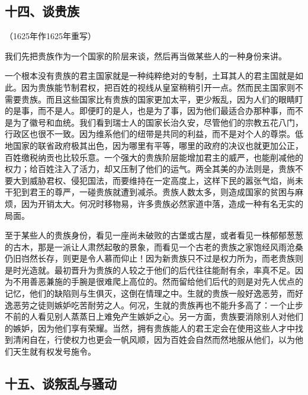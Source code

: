 \subsection*{十四、谈贵族}
\begin{center}
    （1625年作1625年重写）
\end{center}
\par 我们先把贵族作为一个国家的阶层来谈，然后再当做某些人的一种身份来讲。
\par 一个根本没有贵族的君主国家就是一种纯粹绝对的专制，土耳其人的君主国就是如此。因为贵族能节制君权，把百姓的视线从皇室稍稍引开一点。然而民主国家则不需要贵族。而且这些国家比有贵族的国家更加太平，更少叛乱，因为人们的眼睛盯的是事，而不是人。即便盯的是人，也是为了事，因为他们最适合办那种事，而不是为了徽号和血统。我们看到瑞士人的国家长治久安，尽管他们的宗教五花八门，行政区也很不一致。因为维系他们的纽带是共同的利益，而不是对个人的尊崇。低地国家的联省政府极其出色，因为哪里有平等，哪里的政府的决议也就更加公正，百姓缴税纳贡也比较乐意。一个强大的贵族阶层能增加君主的威严，也能削减他的权力；给百姓注入了活力，却又压制了他们的运气。两全其美的办法则是，贵族不要大到威胁君权、侵犯国法，而要维持在一定高度上，这样下民的嚣张气焰，尚未干犯到君王的尊严，一碰贵族就遭到减杀。贵族人数太多，则造成国家的贫困与麻烦，因为开销太大。何况时移物易，许多贵族必然家道中落，造成一种有名无实的局面。
\par 至于某些人的贵族身份，看见一座尚未破败的古堡或古屋，或者看见一株郁郁葱葱的古木，那是一派让人肃然起敬的景象，而看见一个古老的贵族之家饱经风雨沧桑仍旧岿然长存，则更是令人慕而仰止！因为新贵族只不过是权力所为，而老贵族则是时光造就。最初晋升为贵族的人较之于他们的后代往往能耐有余，率真不足。因为不用善恶兼施的手腕是很难爬上高位的。然而留给他们后代的则是对先人优点的记忆，他们的缺陷则与生俱灭，这倒在情理之中。生就的贵族一般好逸恶劳，而好逸恶劳之徒则嫉妒吃苦耐劳之人。何况，生就的贵族再也不能升多高了：一个止步不前的人看见别人蒸蒸日上难免产生嫉妒之心。另一方面，贵族要消除别人对他们的嫉妒，因为他们享有荣耀。当然，拥有贵族能人的君王定会在使用这些人才中找到清闲自在，行使权力也更会一帆风顺，因为百姓会自然而然地服从他们，以为他们天生就有权发号施令。




\subsection*{十五、谈叛乱与骚动}

